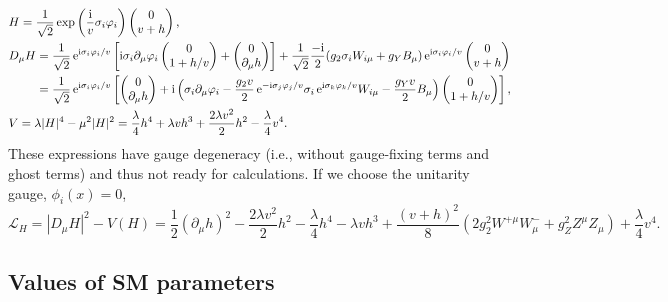 \documentclass[CheatSheet]{subfiles}
\begin{document}
\begin{align}
&H=\frac1{\sqrt2}\exp\left(\frac{\mathrm{i}}{v}\sigma_i\varphi_i\right)\begin{pmatrix}0\\v+h\end{pmatrix},
\\&
 D_\mu H
= \frac1{\sqrt2}\mathop{}\!\mathrm{e}^{\mathrm{i}\sigma_i\varphi_i/v}
\left[\mathrm{i}\sigma_i\partial_\mu\varphi_i\begin{pmatrix}0\\1+h/v\end{pmatrix} + \begin{pmatrix}0\\\partial_\mu h\end{pmatrix}\right]
+\frac1{\sqrt2}\frac{-\mathrm{i}}{2}(g_2\sigma_i W_{i\mu}+g_Y B_\mu)
\mathop{}\!\mathrm{e}^{\mathrm{i}\sigma_i\varphi_i/v}\begin{pmatrix}0\\v+h\end{pmatrix}
\\&\phantom{D_\mu H}
= \frac1{\sqrt2}\mathop{}\!\mathrm{e}^{\mathrm{i}\sigma_i\varphi_i/v}
\left[
\begin{pmatrix}0\\\partial_\mu h\end{pmatrix}
+
\mathrm{i}
\left(
\sigma_i\partial_\mu\varphi_i
-\frac{g_2v}{2}
\mathop{}\!\mathrm{e}^{-\mathrm{i}\sigma_j\varphi_j/v}
\sigma_i
\mathop{}\!\mathrm{e}^{\mathrm{i}\sigma_k\varphi_k/v}
W_{i\mu}-
\frac{g_Y v}{2}B_\mu
\right)
\begin{pmatrix}0\\1+h/v\end{pmatrix}\right],
\\&V=\lambda|H|^4-\mu^2|H|^2=
\frac{\lambda}{4}h^4+\lambda v h^3+\frac{2\lambda v^2}{2}h^2-\frac{\lambda}{4}v^4.
\end{align}
These expressions have gauge degeneracy (i.e., without gauge-fixing terms and  ghost terms) and thus not ready for calculations.
If we choose the unitarity gauge, $\phi_i(x)=0$,
\begin{equation}
\mathcal L_H= |D_\mu H|^2-V(H)=\frac12(\partial_\mu h)^2-\frac{2\lambda v^2}{2}h^2
-\frac{\lambda}{4}h^4-\lambda v h^3
 + \frac{(v+h)^2}{8}(2g_2^2 W^{+\mu}W^-_\mu+g_Z^2Z^\mu Z_\mu)
+\frac{\lambda}{4}v^4.
\end{equation}

\subsection{Values of SM parameters}
\end{document}

